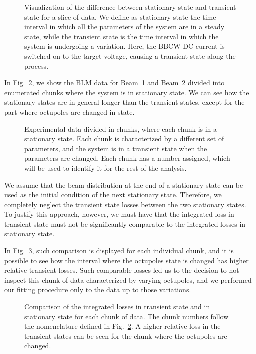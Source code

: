 \begin{figure}[hpt]
    \centering
    \caption{Visualization of the difference between stationary state and transient state for a slice of data. We define as stationary state the time interval in which all the parameters of the system are in a steady state, while the transient state is the time interval in which the system is undergoing a variation. Here, the BBCW DC current is switched on to the target voltage, causing a transient state along the process.}
    \label{fig:transient-state}
\end{figure}

In Fig.~\ref{fig:chunks}, we show the BLM data for Beam~1 and Beam~2 divided into enumerated chunks where the system is in stationary state. We can see how the stationary states are in general longer than the transient states, except for the part where octupoles are changed in state.

\begin{figure}[hpt]
    \centering
    \caption{Experimental data divided in chunks, where each chunk is in a stationary state. Each chunk is characterized by a different set of parameters, and the system is in a transient state when the parameters are changed. Each chunk has a number assigned, which will be used to identify it for the rest of the analysis.}
    \label{fig:chunks}
\end{figure}

We assume that the beam distribution at the end of a stationary state can be used as the initial condition of the next stationary state. Therefore, we completely neglect the transient state losses between the two stationary states. To justify this approach, however, we must have that the integrated loss in transient state must not be significantly comparable to the integrated losses in stationary state.

In Fig.~\ref{fig:wire_loss_comp}, such comparison is displayed for each individual chunk, and it is possible to see how the interval where the octupoles state is changed has higher relative transient losses. Such comparable losses led us to the decision to not inspect this chunk of data characterized by varying octupoles, and we performed our fitting procedure only to the data up to those variations.

\begin{figure}[hpt]
    \centering
    \caption{Comparison of the integrated losses in transient state and in stationary state for each chunk of data. The chunk numbers follow the nomenclature defined in Fig.~\ref{fig:chunks}. A higher relative loss in the transient states can be seen for the chunk where the octupoles are changed.}
    \label{fig:wire_loss_comp}
\end{figure}


